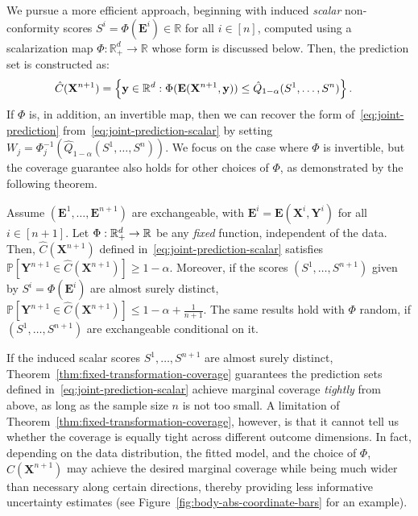 {\color{blue}We pursue a more efficient approach, beginning with induced {\em scalar} non-conformity scores $S^i = \Phi(\mathbf{E}^i) \in \mathbb{R}$ for all $i \in [n]$, computed using a scalarization map $\Phi : \mathbb{R}^d_+ \to \mathbb{R}$ whose form is discussed below.
Then, the prediction set is constructed as:
\begin{equation}
    \begin{aligned}
        \hat{C}(\mathbf{X}^{n+1}) &= \left\{\mathbf y \in \mathbb{R}^d: \Phi(\mathbf E(\mathbf{X}^{n+1},\mathbf y)) \leq \hat{Q}_{1-\alpha}(S^1,\ldots,S^n) \right\}.
    \end{aligned}
    \label{eq:joint-prediction-scalar}
\end{equation}
If $\Phi$ is, in addition, an invertible map, then we can recover the form of~\eqref{eq:joint-prediction} from~\eqref{eq:joint-prediction-scalar} by setting $W_j = \Phi^{-1}_j\left(\hat{Q}_{1-\alpha}(S^1,\ldots,S^n)\right)$. We focus on the case where $\Phi$ is invertible, but the coverage guarantee also holds for other choices of $\Phi$, as demonstrated by the following theorem.

\begin{theorem} \label{thm:fixed-transformation-coverage}
Assume $(\mathbf{E}^1,\ldots,\mathbf{E}^{n+1})$ are exchangeable, with $\mathbf{E}^i = \mathbf E(\mathbf X^i, \mathbf Y^i)$ for all $i \in [n+1]$.
Let $\Phi:\mathbb{R}^d_+ \to \mathbb{R}$ be any \emph{fixed} function, independent of the data.
Then, $\hat{C}(\mathbf{X}^{n+1})$ defined in~\eqref{eq:joint-prediction-scalar} satisfies $\mathbb{P}[ \mathbf{Y}^{n+1} \in \hat{C}(\mathbf{X}^{n+1}) ] \ge 1 - \alpha$.
Moreover, if the scores $(S^1,\ldots,S^{n+1})$ given by $S^i = \Phi(\mathbf{E}^i)$ are almost surely distinct, $\mathbb{P}[ \mathbf{Y}^{n+1} \in \hat{C}(\mathbf{X}^{n+1}) ] \leq 1 - \alpha + \frac{1}{n+1}$.
The same results hold with $\Phi$ random, if $(S^1,\ldots,S^{n+1})$ are exchangeable conditional on it.
\end{theorem}

If the induced scalar scores $S^1,\ldots,S^{n+1}$ are almost surely
distinct, Theorem~\ref{thm:fixed-transformation-coverage} guarantees the prediction sets defined in~\eqref{eq:joint-prediction-scalar} achieve marginal coverage {\em tightly} from above, as long as the sample size $n$ is not too small.
A limitation of Theorem~\ref{thm:fixed-transformation-coverage}, however, is that it cannot tell us whether the coverage is equally tight across different outcome dimensions.
In fact, depending on the data distribution, the fitted model, and the choice of $\Phi$, $\hat{C}(\mathbf{X}^{n+1})$ may achieve the desired marginal coverage while being much wider than necessary along certain directions, thereby providing less informative uncertainty estimates (see Figure~\ref{fig:body-abs-coordinate-bars} for an example).
}

